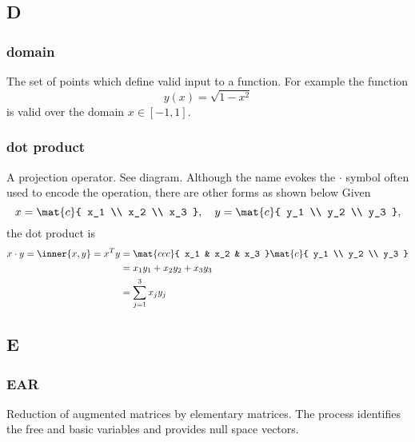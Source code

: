 \subsection*{D} 

\subsubsection*{domain}
The set of points which define valid input to a function. For example the function
\begin{equation}
y(x) = \sqrt{1-x^{2}}
\end{equation}
is valid over the domain $x\in [-1,1]$.

\subsubsection*{dot product}
A projection operator. See diagram. Although the name evokes the $\cdot$ symbol often used to encode the operation, there are other forms as shown below
Given 
\begin{equation}
  x = 
  \mat{c}{
  x_1 \\
  x_2 \\
  x_3
  },
  \quad
  y = 
  \mat{c}{
  y_1 \\
  y_2 \\
  y_3
  },
\end{equation}
the dot product is
\begin{equation}
  \begin{split}
x \cdot y = \inner{x,y} = x^T y 
  &= 
  \mat{ccc}{
  x_1 & x_2 & x_3
  }
  \mat{c}{
  y_1 \\
  y_2 \\
  y_3
  }\\
  & = x_1 y_1 + x_2 y_2 + x_3 y_3 \\
  & = \sum_{j=1}^{3}{x_j y_j}
  \end{split}
\end{equation}

\subsection*{E} 

\subsubsection*{EAR}
Reduction of augmented matrices by elementary matrices. The process identifies the free and basic variables and provides null space vectors.

